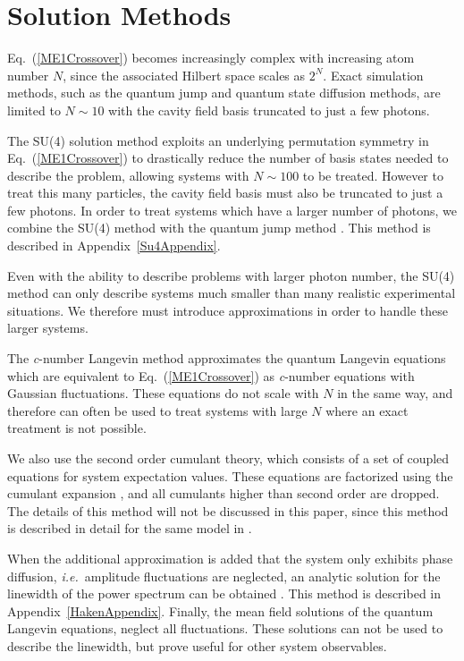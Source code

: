 \documentclass[aps,
twocolumn,
superscriptaddress,groupedaddress]{revtex4}
\begin{document}
\section{Solution Methods}
\label{sec:Methods}

Eq.~(\ref{ME1Crossover}) becomes increasingly complex with increasing
atom number $N$, since the associated Hilbert space scales as $2^N$.
Exact simulation methods, such as the quantum jump and quantum state
diffusion methods, are limited to $N\sim10$ with the cavity field basis
truncated to just a few photons.

The SU(4) solution method \cite{Hartmann:arXiv1201.1732}
\cite{Holland13} exploits an underlying permutation symmetry in
Eq.~(\ref{ME1Crossover}) to drastically reduce the number of basis
states needed to describe the problem, allowing systems with
$N\sim100$ to be treated. However to treat this many particles, the
cavity field basis must also be truncated to just a few photons. In
order to treat systems which have a larger number of photons, we
combine the SU(4) method with the quantum jump method
\cite{Dalibard92} \cite{Dum92} \cite{Knight98}. This method is described in Appendix~\ref{Su4Appendix}.

Even with the ability to describe problems with larger photon number, the SU(4) method can only describe systems much smaller than many realistic experimental situations. We therefore must introduce approximations in order to handle these larger systems.

The {\it c}-number Langevin method \cite{Scully97, PhysRevA.47.1431} approximates the quantum
Langevin equations which are equivalent to Eq.~(\ref{ME1Crossover}) as {\it c}-number equations with Gaussian fluctuations.
These equations do not scale with $N$ in the same way, and therefore can often be used to treat systems with large $N$ where an exact treatment is not possible. 

We also use the second order cumulant theory, which consists of a set of coupled equations for system expectation values. These equations are factorized using the cumulant expansion \cite{JPSJ.17.1100}, and all cumulants higher than second order are dropped. The details of this method will not be discussed in this paper, since this method is described in detail for the same model in  \cite{PhysRevLett.102.163601}.

When the additional approximation is added that the system only exhibits phase diffusion, {\em i.e.}\ amplitude fluctuations are neglected, an analytic solution for the linewidth of the power spectrum can be obtained \cite{HakenLaser, HakenLaserBook}. This method is described in Appendix~\ref{HakenAppendix}.
Finally, the mean field solutions of the quantum Langevin equations, neglect all fluctuations. These solutions 
can not be used to describe the linewidth, but prove useful for other system observables.
\end{document}
